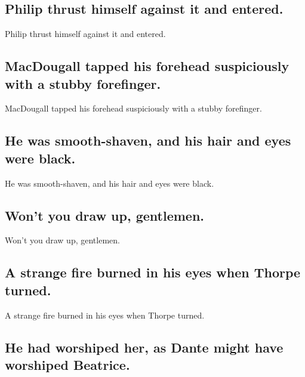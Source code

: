 \documentclass[]{article}
\begin{document}
\hypertarget{philip-thrust-himself-against-it-and-entered.}{%
\subsection{Philip thrust himself against it and
entered.}\label{philip-thrust-himself-against-it-and-entered.}}

Philip thrust himself against it and entered.

\hypertarget{macdougall-tapped-his-forehead-suspiciously-with-a-stubby-forefinger.}{%
\subsection{MacDougall tapped his forehead suspiciously with a stubby
forefinger.}\label{macdougall-tapped-his-forehead-suspiciously-with-a-stubby-forefinger.}}

MacDougall tapped his forehead suspiciously with a stubby forefinger.

\hypertarget{he-was-smooth-shaven-and-his-hair-and-eyes-were-black.}{%
\subsection{He was smooth-shaven, and his hair and eyes were
black.}\label{he-was-smooth-shaven-and-his-hair-and-eyes-were-black.}}

He was smooth-shaven, and his hair and eyes were black.

\hypertarget{wont-you-draw-up-gentlemen.}{%
\subsection{Won't you draw up,
gentlemen.}\label{wont-you-draw-up-gentlemen.}}

Won't you draw up, gentlemen.

\hypertarget{a-strange-fire-burned-in-his-eyes-when-thorpe-turned.}{%
\subsection{A strange fire burned in his eyes when Thorpe
turned.}\label{a-strange-fire-burned-in-his-eyes-when-thorpe-turned.}}

A strange fire burned in his eyes when Thorpe turned.

\hypertarget{he-had-worshiped-her-as-dante-might-have-worshiped-beatrice.}{%
\subsection{He had worshiped her, as Dante might have worshiped
Beatrice.}\label{he-had-worshiped-her-as-dante-might-have-worshiped-beatrice.}}
\end{document}
